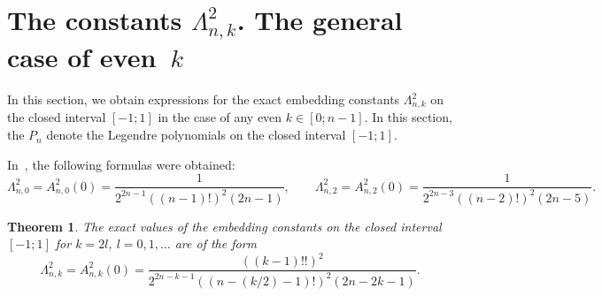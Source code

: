 \documentclass[12pt,oneside]{amsproc}
\numberwithin{equation}{section}
\newtheorem{thm}{Theorem}[section]
\begin{document}
\section{The constants $\Lambda^2_{n,k}$. The general case of even~$k$}
\label{sub:Anchet}

 In this section,
we obtain expressions for the exact embedding constants
$\Lambda^2_{n,k}$
on the closed interval
$[-1;1]$
in the case of any even
$k\in[0;n-1]$.
 In this section,
the $P_n$ denote the Legendre polynomials
on the closed interval
$[-1;1]$.

 In~\cite{Kalyab}, the following formulas were obtained:
$$
\Lambda^2_{n,0}=A^2_{n,0}(0)=\dfrac{1}{2^{2n-1}((n-1)!)^2(2n-1)},\qquad
\Lambda^2_{n,2}=A^2_{n,2}(0)=\dfrac{1}{2^{2n-3}((n-2)!)^2(2n-5)}.
$$

\begin{thm}
 The exact values of the embedding constants
on the closed interval
$[-1;1]$
for
$k=2l$, $l=0,1,\ldots $
are of the form
$$
\Lambda^2_{n,k}=A^2_{n,k}(0)=\dfrac{((k-1)!!)^2}{2^{2n-k-1}((n-(k/2)-1)!)^2(2n-2k-1)}.
$$
\end{thm}
\end{document}
